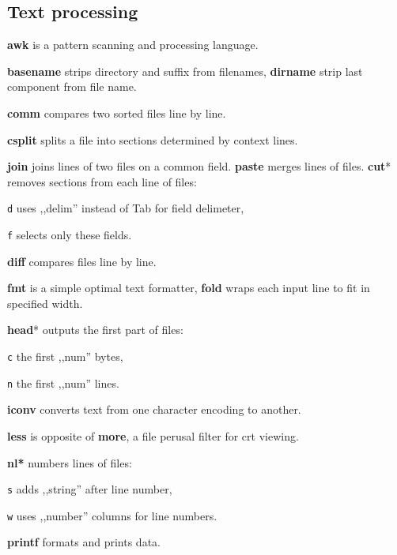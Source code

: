 \subsection{Text processing}

\textbf{awk} is a pattern scanning and processing language.


\textbf{basename} strips directory and suffix from filenames, 
\textbf{dirname} strip last component from file name.

\textbf{comm} compares two sorted files line by line.

\textbf{csplit} splits a file into sections determined by context lines.

\textbf{join} joins lines of two files on a common field.
\textbf{paste} merges lines of files.
\textbf{cut}* removes sections from each line of files:
\begin{enumx}
	\item [\texttt{d}] uses ,,delim'' instead of Tab for field delimeter,
	\item [\texttt{f}] selects only these fields.
\end{enumx}

\textbf{diff} compares files line by line.


\textbf{fmt} is a simple optimal text formatter, 
\textbf{fold} wraps each input line to fit in specified width.

\textbf{head}* outputs the first part of files:
\begin{enumx}
	\item [\texttt{c}] the first ,,num'' bytes,
	\item [\texttt{n}] the first ,,num'' lines.
\end{enumx}

\textbf{iconv} converts text from one character encoding to another.


\textbf{less} is opposite of \textbf{more}, a file perusal filter for crt viewing.

\textbf{nl*} numbers lines of files:
\begin{enumx}
	\item [\texttt{s}] adds ,,string'' after line number,
	\item [\texttt{w}] uses ,,number'' columns for line numbers.
\end{enumx}


\textbf{printf} formats and prints data.

